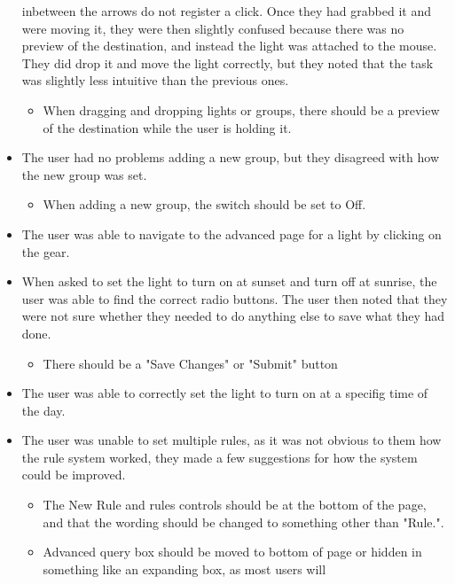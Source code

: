 \documentclass[oneside,openright]{book}
\begin{document}
\begin{itemize}
        inbetween the arrows do not register a click. Once they had grabbed it
        and were moving it, they were then slightly confused because there was
        no preview of the destination, and instead the light was attached to
        the mouse. They did drop it and move the light correctly, but they
        noted that the task was slightly less intuitive than the previous ones.
        \begin{itemize}
            \item When dragging and dropping lights or groups, there should be
                a preview of the destination while the user is holding it.
        \end{itemize}
    \item The user had no problems adding a new group, but they disagreed with
        how the new group was set.
        \begin{itemize}
            \item When adding a new group, the switch should be set to Off.
        \end{itemize}
    \item The user was able to navigate to the advanced page for a light by
        clicking on the gear.
    \item When asked to set the light to turn on at sunset and turn off at
        sunrise, the user was able to find the correct radio buttons. The user
        then noted that they were not sure whether they needed to do anything
        else to save what they had done.
        \begin{itemize}
            \item There should be a "Save Changes" or "Submit" button
        \end{itemize}
    \item The user was able to correctly set the light to turn on at a specifig
        time of the day.
    \item The user was unable to set multiple rules, as it was not obvious to
        them how the rule system worked, they made a few suggestions for how
        the system could be improved.
        \begin{itemize}
            \item The New Rule and rules controls should be at the bottom of
                the page, and that the wording should be changed to something
                other than "Rule.".
            \item Advanced query box should be moved to bottom of page or
                hidden in something like an expanding box, as most users will

\end{itemize}
\end{itemize}
\end{document}
